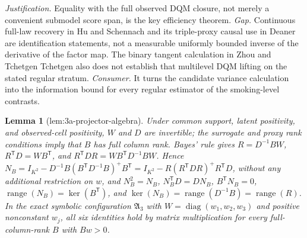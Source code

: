 \documentclass{article}
\newtheorem{lemma}{Lemma}
\begin{document}
\par\smallskip\noindent \textit{Justification.} Equality with the full observed DQM closure, not merely a convenient submodel score span, is the key efficiency theorem. \textit{Gap.} Continuous full-law recovery in Hu and Schennach and its triple-proxy causal use in Deaner are identification statements, not a measurable uniformly bounded inverse of the derivative of the factor map. The binary tangent calculation in Zhou and Tchetgen Tchetgen also does not establish that multilevel DQM lifting on the stated regular stratum. \textit{Consumer.} It turns the candidate variance calculation into the information bound for every regular estimator of the smoking-level contrasts.

\begin{lemma}[lem:3a-projector-algebra]\label{lem:3a-projector-algebra}
Under common support, latent positivity, and observed-cell positivity, \(W\) and \(D\) are invertible; the surrogate and proxy rank conditions imply that \(B\) has full column rank. Bayes' rule gives \(R=D^{-1}BW\), \(R^{\mathsf T}D=WB^{\mathsf T}\), and \(R^{\mathsf T}DR=WB^{\mathsf T}D^{-1}BW\). Hence \(N_B=I_{K^{2}}-D^{-1}B(B^{\mathsf T}D^{-1}B)^{+}B^{\mathsf T}=I_{K^{2}}-R(R^{\mathsf T}DR)^{+}R^{\mathsf T}D\), without any additional restriction on \(w\), and \(N_B^2=N_B\), \(N_B^{\mathsf T}D=DN_B\), \(B^{\mathsf T}N_B=0\), \(\operatorname{range}(N_B)=\ker(B^{\mathsf T})\), and \(\ker(N_B)=\operatorname{range}(D^{-1}B)=\operatorname{range}(R)\). In the exact symbolic configuration \(\mathfrak A_3\) with \(W=\operatorname{diag}(w_1,w_2,w_3)\) and positive nonconstant \(w_j\), all six identities hold by matrix multiplication for every full-column-rank \(B\) with \(Bw>0\).
\end{lemma}
\end{document}
